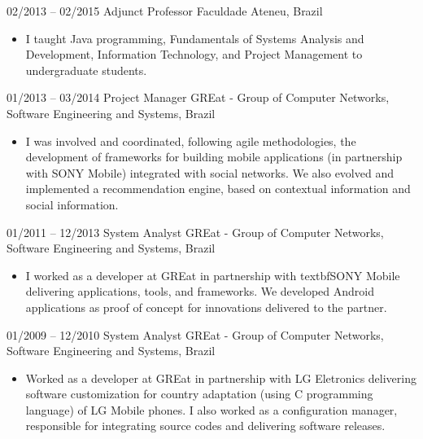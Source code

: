 \begin{entrylist}
	\entry
        {02/2013 -- 02/2015}
		{Adjunct Professor}
		{Faculdade Ateneu, Brazil}
		{
                \vspace{-10pt}
                \begin{itemize}[noitemsep,topsep=0pt,parsep=0pt,partopsep=0pt, leftmargin=-1pt]
                    \item I taught Java programming, Fundamentals of Systems Analysis and Development, Information Technology, and Project Management to undergraduate students.
                \end{itemize} 
            }

	\entry
        {01/2013 -- 03/2014}
		{Project Manager}
		{GREat - Group of Computer Networks, Software Engineering and Systems, Brazil}
		{
                \vspace{-10pt}
                \begin{itemize}[noitemsep,topsep=0pt,parsep=0pt,partopsep=0pt, leftmargin=-1pt]
                    \item I was involved and coordinated, following agile methodologies, the development of frameworks for building mobile applications (in partnership with SONY Mobile) integrated with social networks. We also evolved and implemented a recommendation engine, based on contextual information and social information.
                \end{itemize} 
            }        

	\entry
        {01/2011 -- 12/2013}
		{System Analyst}
		{GREat - Group of Computer Networks, Software Engineering and Systems, Brazil}
		{
                \vspace{-10pt}
                \begin{itemize}[noitemsep,topsep=0pt,parsep=0pt,partopsep=0pt, leftmargin=-1pt]
                    \item I worked as a developer at GREat in partnership with textbf{SONY Mobile} delivering applications, tools, and frameworks. We developed Android applications as proof of concept for innovations delivered to the partner.
                \end{itemize} 
            }        

	\entry
        {01/2009 -- 12/2010}
		{System Analyst}
		{GREat - Group of Computer Networks, Software Engineering and Systems, Brazil}
		{
                \vspace{-10pt}
                \begin{itemize}[noitemsep,topsep=0pt,parsep=0pt,partopsep=0pt, leftmargin=-1pt]
                    \item Worked as a developer at GREat in partnership with LG Eletronics delivering software customization for country adaptation (using C programming language) of LG Mobile phones. I also worked as a configuration manager, responsible for integrating source codes and delivering software releases.
                \end{itemize} 
            }   

        
\end{entrylist}